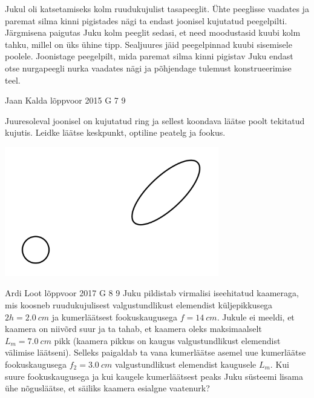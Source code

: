 \documentclass[11pt, twoside]{article}
\begin{document}
{{Jukul oli katsetamiseks kolm ruudukujulist tasapeeglit. Ühte peeglisse vaadates ja paremat silma kinni pigistades nägi ta endast joonisel kujutatud peegelpilti. Järgmisena paigutas Juku kolm peeglit sedasi, et need moodustasid kuubi kolm tahku, millel on üks ühine tipp. Sealjuures jäid peegelpinnad kuubi sisemisele poolele. Joonistage peegelpilt, mida paremat silma kinni pigistav Juku endast otse nurgapeegli nurka vaadates nägi ja põhjendage tulemust konstrueerimise teel.
\fi
}

{Jaan Kalda} %
{lõppvoor} %
{2015} %
{G 7} %
{9} %
{
\ifStatement
Juuresoleval joonisel on kujutatud ring ja sellest koondava läätse poolt tekitatud kujutis. Leidke läätse keskpunkt, optiline peatelg ja fookus.
\begin{center}
\includegraphics[width=0.7\textwidth]{2015-v3g-07-ringjaellips}%
\end{center}
\fi
}

{Ardi Loot} %
{lõppvoor} %
{2017} %
{G 8} %
{9} %
{
\ifStatement
Juku pildistab virmalisi iseehitatud kaameraga, mis koosneb ruudukujulisest
valgustundlikust elemendist küljepikkusega $2h=\SI{2.0}{cm}$ ja kumerläätsest
fookuskaugusega $f=\SI{14}{cm}.$ Jukule ei meeldi, et kaamera on
niivõrd suur ja ta tahab, et kaamera oleks maksimaalselt $L_{m}=\SI{7.0}{cm}$
pikk (kaamera pikkus on kaugus valgustundlikust elemendist välimise läätseni).
Selleks paigaldab ta vana kumerläätse asemel uue kumerläätse fookuskaugusega $f_{2}=\SI{3.0}{cm}$
valgustundlikust elemendist kaugusele $L_{m}.$ Kui suure fookuskaugusega
ja kui kaugele kumerläätsest peaks Juku süsteemi
lisama ühe nõgusläätse, et säiliks kaamera esialgne vaatenurk?
\fi
}

}
\end{document}
